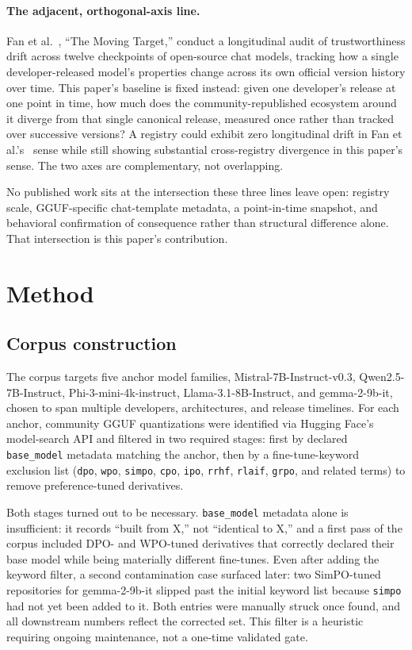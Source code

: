 \documentclass[letterpaper,twocolumn,10pt]{article}
\begin{document}
\paragraph{The adjacent, orthogonal-axis line.} Fan et al.~\cite{fan2026moving}, ``The Moving Target,'' conduct a longitudinal audit of trustworthiness drift across twelve checkpoints of open-source chat models, tracking how a single developer-released model's properties change across its own official version history over time. This paper's baseline is fixed instead: given one developer's release at one point in time, how much does the community-republished ecosystem around it diverge from that single canonical release, measured once rather than tracked over successive versions? A registry could exhibit zero longitudinal drift in Fan et al.'s~\cite{fan2026moving} sense while still showing substantial cross-registry divergence in this paper's sense. The two axes are complementary, not overlapping.

No published work sits at the intersection these three lines leave open: registry scale, GGUF-specific chat-template metadata, a point-in-time snapshot, and behavioral confirmation of consequence rather than structural difference alone. That intersection is this paper's contribution.

\section{Method}
\label{sec:method}

\subsection{Corpus construction}

The corpus targets five anchor model families, Mistral-7B-Instruct-v0.3, Qwen2.5-7B-Instruct, Phi-3-mini-4k-instruct, Llama-3.1-8B-Instruct, and gemma-2-9b-it, chosen to span multiple developers, architectures, and release timelines. For each anchor, community GGUF quantizations were identified via Hugging Face's model-search API and filtered in two required stages: first by declared \texttt{base\_model} metadata matching the anchor, then by a fine-tune-keyword exclusion list (\texttt{dpo}, \texttt{wpo}, \texttt{simpo}, \texttt{cpo}, \texttt{ipo}, \texttt{rrhf}, \texttt{rlaif}, \texttt{grpo}, and related terms) to remove preference-tuned derivatives.

Both stages turned out to be necessary. \texttt{base\_model} metadata alone is insufficient: it records ``built from X,'' not ``identical to X,'' and a first pass of the corpus included DPO- and WPO-tuned derivatives that correctly declared their base model while being materially different fine-tunes. Even after adding the keyword filter, a second contamination case surfaced later: two SimPO-tuned repositories for gemma-2-9b-it slipped past the initial keyword list because \texttt{simpo} had not yet been added to it. Both entries were manually struck once found, and all downstream numbers reflect the corrected set. This filter is a heuristic requiring ongoing maintenance, not a one-time validated gate.
\end{document}
